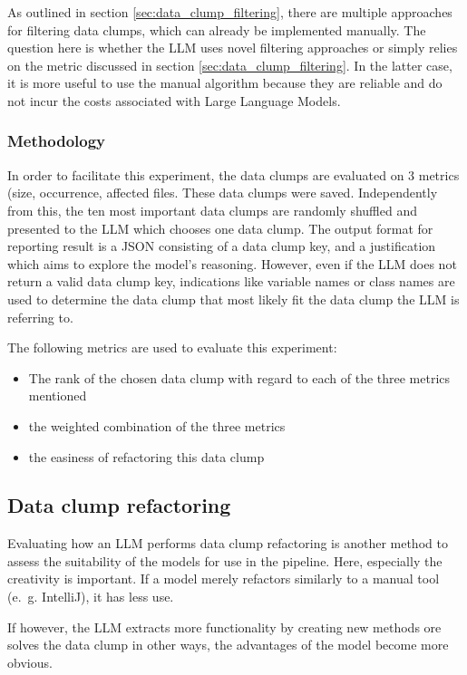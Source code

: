 As outlined in section \ref{sec:data_clump_filtering}, there are multiple approaches for filtering data clumps, which can already be implemented manually. 
The question here is whether the \ac{LLM} uses novel filtering approaches or simply relies on the metric discussed in section \ref{sec:data_clump_filtering}. In the latter case, it is more useful to use the manual algorithm because they are reliable and do not incur the costs associated with Large Language Models. 

\subsubsection{Methodology}
In order to facilitate this experiment, the data clumps are evaluated on 3 metrics (size, occurrence, affected files. These data clumps were saved. Independently from this, the ten most important data clumps are randomly shuffled and presented to the \ac{LLM} which chooses one data clump. The output format for reporting result is a \ac{JSON}  consisting of a data clump key, and a justification which aims to explore the model's reasoning. However, even if the \ac{LLM} does not return a valid data clump key, indications like variable names or class names are used to determine the data clump that most likely fit the data clump the \ac{LLM} is referring to. 

The following metrics are used to evaluate this experiment:
\begin{itemize}
    \item The rank of the chosen data clump with regard to each of the three metrics mentioned
    \item the weighted combination of the three metrics
    \item the easiness of refactoring this data clump
\end{itemize}


\subsection{Data clump refactoring}

Evaluating how an \ac{LLM} performs data clump refactoring is another method to assess the suitability of the models for use in the pipeline. Here, especially the creativity is important. If a model merely refactors similarly to a manual tool (e.~g. IntelliJ), it has less use.

If however, the \ac{LLM} extracts more functionality by creating new methods ore solves the data clump in other ways, the advantages of the model become more obvious.


